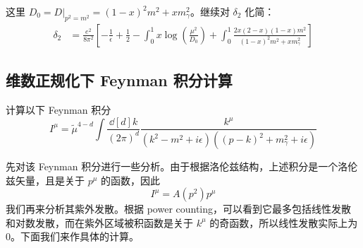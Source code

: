 这里 $D_0 = D|_{p^2=m^2}=(1-x)^2 m^2+x m_\gamma^2 $。继续对 $\delta_2$ 化简：
\begin{equation}
\begin{aligned}
\delta_2 &= \frac{e^2}{8\pi^2}\left[-\frac{1}{\epsilon}+\frac{1}{2}-\int_0^1 x\log\left(\frac{\mu^2}{D_0} \right) 
+\int_0^1 \frac{2x(2-x)(1-x)m^2}{(1-x)^2m^2+xm_\gamma^2}
\right]
\end{aligned}
\end{equation}


\subsection{维数正规化下 Feynman 积分计算}
\begin{exercise}{}
计算以下 Feynman 积分
\begin{equation}
I^\mu = \tilde{\mu}^{4-d}\int\frac{\dd[d]{k}}{(2\pi)^d} \frac{k^\mu}{(k^2-m^2+i\epsilon)((p-k)^2+m_\gamma^2+i\epsilon)}
\end{equation}
\end{exercise}
先对该 Feynman 积分进行一些分析。由于根据洛伦兹结构，上述积分是一个洛伦兹矢量，且是关于 $p^\mu$ 的函数，因此
\begin{equation}
I^\mu = A(p^2) p^\mu
\end{equation}
我们再来分析其紫外发散。根据 power counting，可以看到它最多包括线性发散和对数发散，而在紫外区域被积函数是关于 $k^\mu$ 的奇函数，所以线性发散实际上为 $0$。下面我们来作具体的计算。


